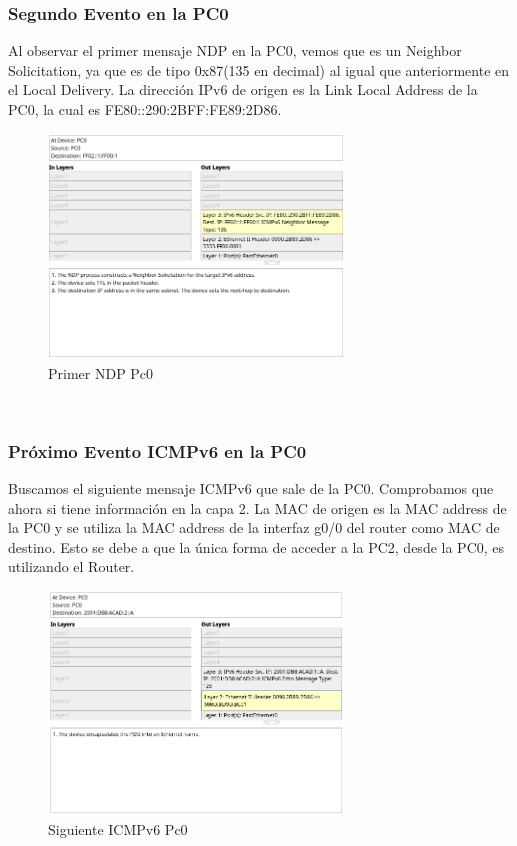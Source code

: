 \documentclass[a4paper,12pt]{article}
\begin{document}
\subsubsection{Segundo Evento en la PC0}
Al observar el primer mensaje NDP en la PC0, vemos que es un Neighbor Solicitation, ya que es de tipo 0x87(135 en decimal) al igual que anteriormente en el Local Delivery. La dirección IPv6 de origen es la Link Local Address de la PC0, la cual es FE80::290:2BFF:FE89:2D86.\\
\begin{figure}[h]
    \centering
    \includegraphics[width=0.7\textwidth]{imagenes/2.png}
    \caption{Primer NDP Pc0}
\end{figure}\\
\FloatBarrier
\subsubsection{Próximo Evento ICMPv6 en la PC0}
Buscamos el siguiente mensaje ICMPv6 que sale de la PC0. Comprobamos que ahora si tiene información en la capa 2. La MAC de origen es la MAC address de la PC0 y se utiliza la MAC address de la interfaz g0/0 del router como MAC de destino. Esto se debe a que la única forma de acceder a la PC2, desde la PC0, es utilizando el Router.\\
\begin{figure}[h]
    \centering
    \includegraphics[width=0.7\textwidth]{imagenes/3.png}
    \caption{Siguiente ICMPv6 Pc0}
\end{figure}\\
\FloatBarrier
\end{document}
